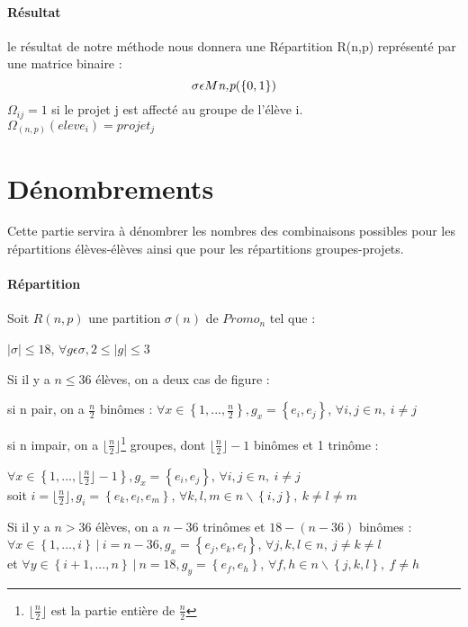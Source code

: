 \documentclass[10pt,a4paper]{scrartcl}
\begin{document}
\paragraph{Résultat}
le résultat de notre méthode nous donnera une Répartition R(n,p) représenté par une matrice binaire :
$$\sigma\epsilon M\emph{n,p}(\lbrace0,1\rbrace)$$
$\Omega_{ij}=1$ si le projet j est affecté au groupe de l'élève i.\\
$\Omega_{(n,p)}(eleve_{i})=projet_{j}$

\section{Dénombrements}
Cette partie servira à dénombrer les nombres des combinaisons possibles pour les répartitions élèves-élèves ainsi que pour les répartitions groupes-projets.
\paragraph{Répartition}Soit $R(n,p)$ une partition $\sigma(n)$ de $Promo_{n}$ tel que : \\
\begin{center}
	$|\sigma|\leq18$, $\forall g\epsilon\sigma , 2\leq |g| \leq3$
\end{center}
Si il y a $n \leqslant 36$ élèves, on a deux cas de figure : \\
\begin{itemize}
	\begin{item}
		si n pair, on a $\frac{n}{2}$ binômes :  $\forall x \in \left\{ 1, ..., \frac{n}{2} \right\}, g_{x} = \left\{ e_{i}, e_{j} \right\}$, $\forall i, j \in n,\ i \neq j$
	\end{item}
	\begin{item}
		si n impair, on a  $\lfloor \frac{n}{2} \rfloor$\footnote{$\lfloor \frac{n}{2} \rfloor$ est la partie entière de $\frac{n}{2}$} groupes, dont $\lfloor \frac{n}{2} \rfloor-1$ binômes et 1 trinôme :
		
		$\forall x \in \left\{ 1, ..., \lfloor \frac{n}{2} \rfloor -1 \right\}, g_{x} = \left\{ e_{i}, e_{j} \right\}$, $\forall i, j \in n,\ i \neq j$ \\
		soit $i=\lfloor \frac{n}{2} \rfloor, g_{i} = \left\{ e_{k}, e_{l}, e_{m} \right\}$, $\forall k, l, m \in n\backslash\left\{ i, j \right\},\ k \neq l \neq m$ \newline
	\end{item}
\end{itemize}

Si il y a $n > 36$ élèves, on a $n-36$ trinômes et $18-(n-36)$ binômes : \\
$\forall x \in \left\{ 1, ..., i \right\} \ | \ i=n-36, g_{x} = \left\{ e_{j}, e_{k}, e_{l} \right\}$, $\forall j, k, l \in n,\ j \neq k \neq l$ \\
et $\forall y \in \left\{ i+1, ..., n \right\} \ | \ n=18, g_{y} = \left\{ e_{f}, e_{h} \right\}$, $\forall f, h \in n\backslash\left\{ j, k, l \right\},\ f \neq h$
\end{document}
